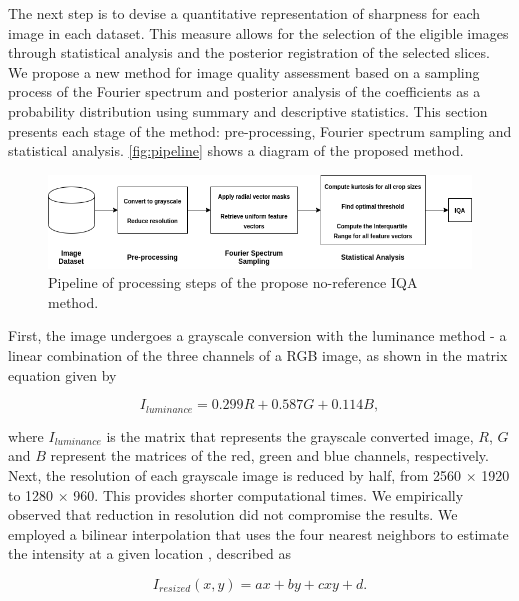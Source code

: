 The next step is to devise a quantitative representation of sharpness for each image in each dataset. This measure allows for the selection of the eligible images through statistical analysis and the posterior registration of the selected slices. We propose a new method for image quality assessment based on a sampling process of the Fourier spectrum and posterior analysis of the coefficients as a probability distribution using summary and descriptive statistics. This section presents each stage of the method: pre-processing, Fourier spectrum sampling and statistical analysis. \autoref{fig:pipeline} shows a diagram of the proposed method.

\begin{figure}[ht]
  \centering
  \includegraphics[scale=0.6]{images/nr-iqa_pipeline.png}
  \caption{Pipeline of processing steps of the propose no-reference IQA method.}
  \label{fig:pipeline}
\end{figure}

First, the image undergoes a grayscale conversion with the luminance method \cite{ponti2016image} - a 
linear combination of the three channels of a RGB image, as shown in the matrix equation given by

\begin{equation}
    \label{eqn:luminance}
    I_{luminance} = 0.299R + 0.587G + 0.114B,
\end{equation}

\noindent where $I_{luminance}$ is the matrix that represents the grayscale converted image, $R$, $G$ and $B$ represent the matrices of the red, green and blue channels, respectively. Next, the resolution of each grayscale image is reduced by half, from 2560 $\times$ 1920 to 1280 $\times$ 960. This provides shorter computational times. We empirically observed that  reduction in resolution did not compromise the results. We employed a bilinear interpolation that uses the four nearest neighbors to estimate the intensity at a given location \cite{gonzalez2018digital}, described as

\begin{equation}
\label{eqn:bilinear_interpolation}
I_{resized}(x,y) = ax + by + cxy + d.
\end{equation}


